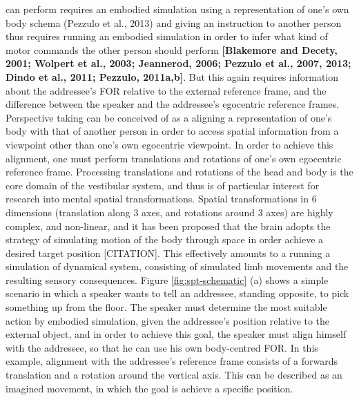 \documentclass[english,floatsintext,man]{apa6}
\theoremstyle{definition}
\theoremstyle{definition}
\theoremstyle{remark}
\begin{document}
can perform requires an embodied simulation using a representation of
one's own body schema (Pezzulo et al., 2013) and giving an instruction
to another person thus requires running an embodied simulation in order
to infer what kind of motor commands the other person should perform
\textbf{{[}Blakemore and Decety, 2001; Wolpert et al., 2003; Jeannerod,
2006; Pezzulo et al., 2007, 2013; Dindo et al., 2011; Pezzulo,
2011a,b{]}}. But this again requires information about the addressee's
FOR relative to the external reference frame, and the difference between
the speaker and the addressee's egocentric reference frames. Perspective
taking can be conceived of as a aligning a representation of one's body
with that of another person in order to access spatial information from
a viewpoint other than one's own egocentric viewpoint. In order to
achieve this alignment, one must perform translations and rotations of
one's own egocentric reference frame. Processing translations and
rotations of the head and body is the core domain of the vestibular
system, and thus is of particular interest for research into mental
spatial transformations. Spatial transformations in 6 dimensions
(translation along 3 axes, and rotations around 3 axes) are highly
complex, and non-linear, and it has been proposed that the brain adopts
the strategy of simulating motion of the body through space in order
achieve a desired target position {[}CITATION{]}. This effectively
amounts to a running a simulation of dynamical system, consisting of
simulated limb movements and the resulting sensory consequences. Figure
\ref{fig:spt-schematic} (a) shows a simple scenario in which a speaker
wants to tell an addressee, standing opposite, to pick something up from
the floor. The speaker must determine the most suitable action by
embodied simulation, given the addressee's position relative to the
external object, and in order to achieve this goal, the speaker must
align himself with the addressee, so that he can use his own
body-centred FOR. In this example, alignment with the addressee's
reference frame consists of a forwards translation and a rotation around
the vertical axis. This can be described as an imagined movement, in
which the goal is achieve a specific position.
\end{document}

